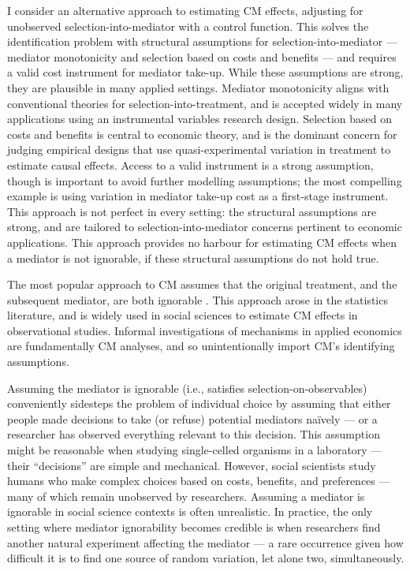 I consider an alternative approach to estimating CM effects, adjusting for unobserved selection-into-mediator with a control function.
This solves the identification problem with structural assumptions for selection-into-mediator --- mediator monotonicity and selection based on costs and benefits --- and requires a valid cost instrument for mediator take-up.
While these assumptions are strong, they are plausible in many applied settings.
Mediator monotonicity aligns with conventional theories for selection-into-treatment, and is accepted widely in many applications using an instrumental variables research design.
Selection based on costs and benefits is central to economic theory, and is the dominant concern for judging empirical designs that use quasi-experimental variation in treatment to estimate causal effects.
Access to a valid instrument is a strong assumption, though is important to avoid further modelling assumptions; the most compelling example is using variation in mediator take-up cost as a first-stage instrument.
This approach is not perfect in every setting: the structural assumptions are strong, and are tailored to selection-into-mediator concerns pertinent to economic applications.
This approach provides no harbour for estimating CM effects when a mediator is not ignorable, if these structural assumptions do not hold true.

The most popular approach to CM assumes that the original treatment, and the subsequent mediator, are both ignorable \citep{imai2010identification}.
This approach arose in the statistics literature, and is widely used in social sciences to estimate CM effects in observational studies.
Informal investigations of mechanisms in applied economics are fundamentally CM analyses, and so unintentionally import CM's identifying assumptions.

Assuming the mediator is ignorable (i.e., satisfies selection-on-observables) 
conveniently sidesteps the problem of individual choice by assuming that either people made decisions to take (or refuse) potential mediators na\"ively --- or a researcher has observed everything relevant to this decision.
This assumption might be reasonable when studying single-celled organisms in a laboratory --- their ``decisions'' are simple and mechanical.
However, social scientists study humans who make complex choices based on costs, benefits, and preferences --- many of which remain unobserved by researchers.
Assuming a mediator is ignorable in social science contexts is often unrealistic.
In practice, the only setting where mediator ignorability becomes credible is when researchers find another natural experiment affecting the mediator --- a rare occurrence given how difficult it is to find one source of random variation, let alone two, simultaneously.

